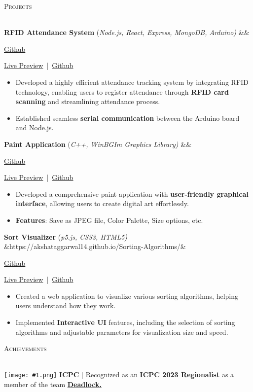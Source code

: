 \documentclass[a4paper]{article}
\newcommand{\tinyBulletSep} { \vspace{1.5mm} }
\newcommand{\bulletSep} { \vspace{2mm} }
\newcommand{\sectionSep} { \vspace{3mm} }
\newcommand{\lineunder} {
    \vspace*{-8pt} \\
    \hspace*{-15pt} \hrulefill \\
}
\newcommand{\header} [1] {
    {\hspace*{-18pt}\vspace*{6pt} {
        \fontfamily{qcs}\selectfont \large \scshape #1
    }}
    \vspace*{-6pt} \lineunder
    \vspace{1.1mm}
}
\newcommand{\linkFont}[1]{
    {\fontfamily{lmtt}\selectfont#1}
}
\newcommand{\link}[2]{
    {\fontfamily{lmtt}\selectfont\href{#1}{#2}}
}
\newcommand{\projectItem}[5]{
    {\textbf{#1}} {(\sl #2)}\hfill
    \ifx&#3&%
    \link{#4}{Github}\\
    \else
    \linkFont{\href{#3}{Live Preview}~|~\href{#4}{Github}}\\
    \fi
    \vspace{2pt}
    \begin{itemize}
        #5
    \end{itemize}
}
\newcommand{\image}[1]{
    \begingroup
    \normalfont
    \Large
    \texttt{[image: \#1.png]}%
    \endgroup
}
\begin{document}

\header{Projects}

\projectItem{RFID Attendance System}{Node.js, React, Express, MongoDB, Arduino}{}{https://github.com/AkshatAggarwal14/RFID-Attendance-system}{
    \item Developed a highly efficient attendance tracking system by integrating RFID technology, enabling users to register attendance through \textbf{RFID card scanning} and streamlining attendance process.
    \item Established seamless \textbf{serial communication} between the Arduino board and Node.js.
}
\bulletSep

\projectItem{Paint Application}{C++, WinBGIm Graphics Library}{}{https://github.com/Sahil-187/Paint-Application}{
    \item Developed a comprehensive paint application with \textbf{user-friendly graphical interface}, allowing users to create digital art effortlessly.
    \item \textbf{Features}: Save as JPEG file, Color Palette, Size options, etc.
}
\bulletSep

\projectItem{Sort Visualizer}{p5.js, CSS3, HTML5}{https://akshataggarwal14.github.io/Sorting-Algorithms/}{https://github.com/AkshatAggarwal14/Sorting-Algorithms/}{
    \item Created a web application to visualize various sorting algorithms, helping users understand how they work.
    \item Implemented \textbf{Interactive UI} features, including the selection of sorting algorithms and adjustable parameters for visualization size and speed.
}

\sectionSep


\header{Achievements}

\image{icpc} \textbf{ICPC} | Recognized as an \textbf{ICPC 2023 Regionalist} as a member of the team\textbf{\link{https://icpc.global/ICPCID/6IIRHHSFPAXF}{Deadlock.}}
\tinyBulletSep
\end{document}
